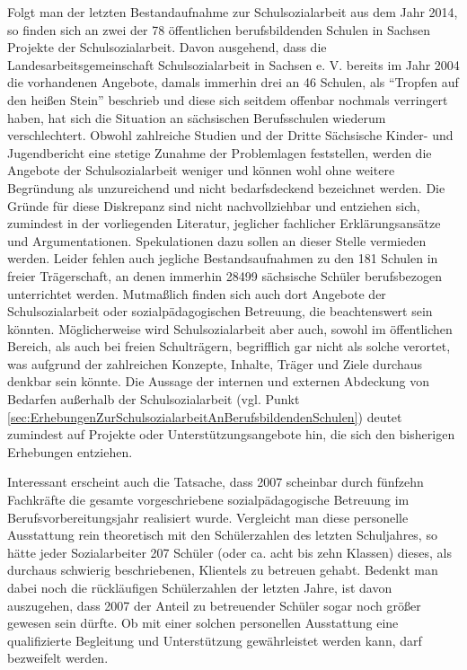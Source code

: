 {Folgt man der letzten Bestandaufnahme zur Schulsozialarbeit aus dem Jahr 2014, so finden sich an zwei der 78 öffentlichen berufsbildenden Schulen in Sachsen Projekte der Schulsozialarbeit. Davon ausgehend, dass die Landesarbeitsgemeinschaft Schulsozialarbeit in Sachsen e. V. bereits im Jahr 2004 die vorhandenen Angebote, damals immerhin drei an 46 Schulen, als "`Tropfen auf den heißen Stein"' beschrieb und diese sich seitdem offenbar nochmals verringert haben, hat sich die Situation an sächsischen Berufsschulen wiederum verschlechtert. Obwohl zahlreiche Studien und der Dritte Sächsische Kinder- und Jugendbericht eine stetige Zunahme der Problemlagen feststellen, werden die Angebote der Schulsozialarbeit weniger und können wohl ohne weitere Begründung als unzureichend und nicht bedarfsdeckend bezeichnet werden. Die Gründe für diese Diskrepanz sind nicht nachvollziehbar und entziehen sich, zumindest in der vorliegenden Literatur, jeglicher fachlicher Erklärungsansätze und Argumentationen. Spekulationen dazu sollen an dieser Stelle vermieden werden. Leider fehlen auch jegliche Bestandsaufnahmen zu den 181 Schulen in freier Trägerschaft, an denen immerhin 28499 sächsische Schüler berufsbezogen unterrichtet werden. Mutmaßlich finden sich auch dort Angebote der Schulsozialarbeit oder sozialpädagogischen Betreuung, die beachtenswert sein könnten. Möglicherweise wird Schulsozialarbeit aber auch, sowohl im öffentlichen Bereich, als auch bei freien Schulträgern, begrifflich gar nicht als solche verortet, was aufgrund der zahlreichen Konzepte, Inhalte, Träger und Ziele durchaus denkbar sein könnte. Die Aussage der internen und externen Abdeckung von Bedarfen außerhalb der Schulsozialarbeit (vgl. Punkt \ref{sec:ErhebungenZurSchulsozialarbeitAnBerufsbildendenSchulen}) deutet zumindest auf Projekte oder Unterstützungsangebote hin, die sich den bisherigen Erhebungen entziehen. 

Interessant erscheint auch die Tatsache, dass 2007 scheinbar durch fünfzehn Fachkräfte die gesamte vorgeschriebene sozialpädagogische Betreuung im Berufsvorbereitungsjahr realisiert wurde. Vergleicht man diese personelle Ausstattung rein theoretisch mit den Schülerzahlen des letzten Schuljahres, so hätte jeder Sozialarbeiter 207 Schüler (oder ca. acht bis zehn Klassen) dieses, als durchaus schwierig beschriebenen, Klientels zu betreuen gehabt. Bedenkt man dabei noch die rückläufigen Schülerzahlen der letzten Jahre, ist davon auszugehen, dass 2007 der Anteil zu betreuender Schüler sogar noch größer gewesen sein dürfte. Ob mit einer solchen personellen Ausstattung eine qualifizierte Begleitung und Unterstützung gewährleistet werden kann, darf bezweifelt werden.

}
